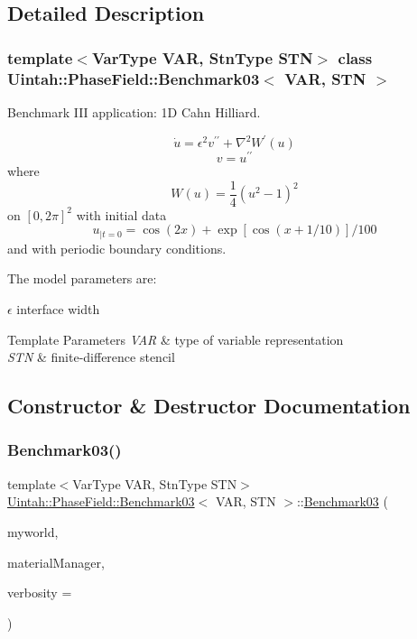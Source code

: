 \subsection{Detailed Description}
\subsubsection*{template$<$Var\+Type V\+AR, Stn\+Type S\+TN$>$\newline
class Uintah\+::\+Phase\+Field\+::\+Benchmark03$<$ V\+A\+R, S\+T\+N $>$}

Benchmark I\+II application\+: 1D Cahn Hilliard. 

\[ \dot u = \epsilon^2 v^{\prime\prime} + \nabla^2 W^\prime(u) \] \[ v = u^{\prime\prime} \] where \[ W (u) = \frac{1}{4} (u^2 − 1)^2 \] on $[0, 2\pi]^2$ with initial data \[ u_{|t=0} = \cos(2x) + \exp[ \cos(x+1/10) ]/100 \] and with periodic boundary conditions.

The model parameters are\+:
\begin{DoxyItemize}
\item $ \epsilon $ interface width
\end{DoxyItemize}


\begin{DoxyTemplParams}{Template Parameters}
{\em V\+AR} & type of variable representation \\
\hline
{\em S\+TN} & finite-\/difference stencil \\
\hline
\end{DoxyTemplParams}


\subsection{Constructor \& Destructor Documentation}
\mbox{\label{classUintah_1_1PhaseField_1_1Benchmark03_ad2f44d664d62ff81a6f7ec039d779c35}} 
\subsubsection{\texorpdfstring{Benchmark03()}{Benchmark03()}\hspace{0.1cm}{\footnotesize\ttfamily [1/2]}}
{\footnotesize\ttfamily template$<$Var\+Type V\+AR, Stn\+Type S\+TN$>$ \\
\hyperlink{classUintah_1_1PhaseField_1_1Benchmark03}{Uintah\+::\+Phase\+Field\+::\+Benchmark03}$<$ V\+AR, S\+TN $>$\+::\hyperlink{classUintah_1_1PhaseField_1_1Benchmark03}{Benchmark03} (\begin{DoxyParamCaption}\item[{const Processor\+Group $\ast$}]{myworld,  }\item[{const Material\+ManagerP}]{material\+Manager,  }\item[{int}]{verbosity = {} }\end{DoxyParamCaption})}



